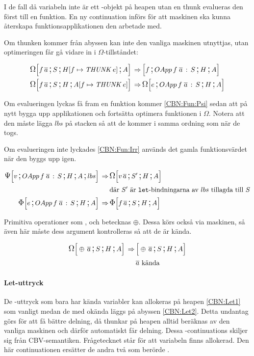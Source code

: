 \documentclass[../Optimise]{subfiles}
\begin{document}
I de fall då variabeln inte är ett -objekt på heapen utan en thunk evalueras den först
till en funktion. En ny continuation  införs för att maskinen
ska kunna återskapa funktionsapplikationen den arbetade med.

Om thunken kommer från abyssen kan inte den vanliga maskinen utnyttjas, utan optimeringen får
gå vidare in i $\Omega$-tillståndet:

\begin{align}
\CBNOMEGA S{\heap f{\THUNK e}}A{f\, \many{a}}  \rulesep & \CBNMC f{\cOApp f{\many{a}}S}HA\\
\CBNOMEGA SH{\abyss f{\THUNK e}}{f\, \many{a}}  \rulesep & \CBNOMEGA{\cOApp f{\many{a}}S}HAe
\end{align}

Om evalueringen lyckas få fram en funktion kommer \eqref{CBN:Fun:Psi} sedan att
på nytt bygga upp applikationen och fortsätta optimera funktionen i $\Omega$.
Notera att den måste lägga $lbs$ på stacken så att de kommer i samma ordning som när de togs.

Om evalueringen inte lyckades \eqref{CBN:Fun:Irr} används det gamla funktionsvärdet
när den byggs upp igen.

\begin{align}
\label{CBN:Fun:Psi}\CBNPSI{\cOApp f{\many{a}}S}HA{lbs}v  \rulesep & \CBNOMEGA {S'}HA{v\, \many{a}} \\
 & \text{där } S' \text{ är \kw{let}-bindningarna av } lbs \text{ tillagda till } S \nonumber \\
\label{CBN:Fun:Irr}\CBNIRR {\cOApp f {\many{a}}S}HAe  \rulesep & \CBNIRR SHA{f\, \many{a}}
\end{align}

Primitiva operationer som \ic{+\#}, \ic{*\#} och \ic{==\#} betecknas $\oplus$. 
Dessa körs också via maskinen, så även här måste dess argument kontrolleras så att de är kända.

\begin{align}
\CBNOMEGA SHA{\oplus\, \many{a}}  \rulesep & \CBNMC{\oplus\, \many{a}}SHA \\
 & \many{a} \text{ kända } \nonumber
\end{align}


\paragraph{Let-uttryck}
De -uttryck som bara har kända variabler kan allokeras på heapen \eqref{CBN:Let1} som vanligt
medan de med okända läggs på abyssen \eqref{CBN:Let2}.
Detta undantag görs för att få bättre delning, då thunkar på heapen alltid beräknas
av den vanliga maskinen och därför automatiskt får delning. Dessa
-continuations skiljer sig från CBV-semantiken. Frågetecknet står för
att variabeln finns allokerad. Den här continuationen ersätter de andra två
som berörde .
\end{document}
